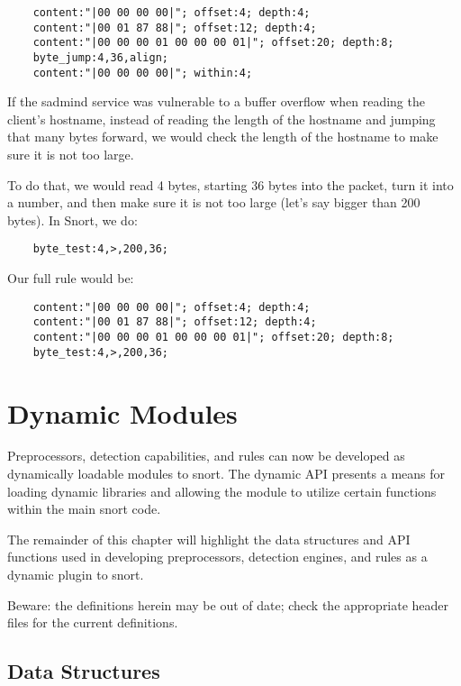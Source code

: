 \documentclass[english]{report}
\begin{document}
\begin{verbatim}
    content:"|00 00 00 00|"; offset:4; depth:4;
    content:"|00 01 87 88|"; offset:12; depth:4;
    content:"|00 00 00 01 00 00 00 01|"; offset:20; depth:8;
    byte_jump:4,36,align;
    content:"|00 00 00 00|"; within:4;
\end{verbatim}

If the sadmind service was vulnerable to a buffer overflow when reading the
client's hostname, instead of reading the length of the hostname and jumping
that many bytes forward, we would check the length of the hostname to make sure
it is not too large.  

To do that, we would read 4 bytes, starting 36 bytes into the packet, turn it
into a number, and then make sure it is not too large (let's say bigger than
200 bytes).  In Snort, we do: 

\begin{verbatim}
    byte_test:4,>,200,36;
\end{verbatim}
    
Our full rule would be:    

\begin{verbatim}
    content:"|00 00 00 00|"; offset:4; depth:4;
    content:"|00 01 87 88|"; offset:12; depth:4;
    content:"|00 00 00 01 00 00 00 01|"; offset:20; depth:8;
    byte_test:4,>,200,36;
\end{verbatim}

\chapter{Dynamic Modules}\label{Dynamic Modules}

Preprocessors, detection capabilities, and rules can now be developed as
dynamically loadable modules to snort.  The dynamic API presents a means for
loading dynamic libraries and allowing the module to utilize certain functions
within the main snort code.

The remainder of this chapter will highlight the data structures and API
functions used in developing preprocessors, detection engines, and rules as a
dynamic plugin to snort.

Beware:  the definitions herein may be out of date; check the appropriate
header files for the current definitions.

\section{Data Structures}
\end{document}
